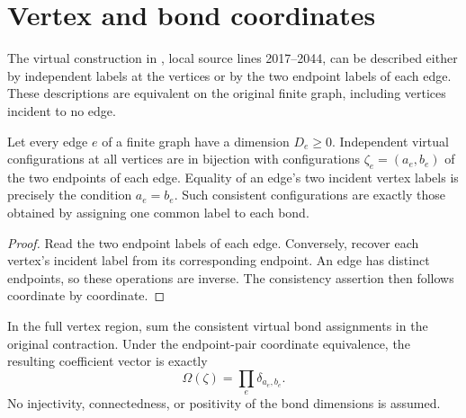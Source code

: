 \section{Vertex and bond coordinates}%
\label{sec:peps_vertex_bond_coordinates}

The virtual construction in \cite[Section~IV.C.1]{Cirac2021Matrix},
local source lines 2017--2044, can be described either by
independent labels at the vertices or by the two endpoint labels
of each edge. These descriptions are equivalent on the original
finite graph, including vertices incident to no edge.

\begin{lemma}%
    \label{thm:peps_vertex_bond_coordinates}
    \leanok
    Let every edge $e$ of a finite graph have a dimension $D_e\ge0$.
    Independent virtual configurations at all vertices are
    in bijection with configurations
    $\zeta_e=(a_e,b_e)$ of the two endpoints of each edge.
    Equality of an edge's two incident vertex labels is precisely
    the condition $a_e=b_e$.
    Such consistent configurations are exactly those obtained
    by assigning one common label to each bond.
\end{lemma}

\begin{proof}\leanok
    Read the two endpoint labels of each edge. Conversely, recover
    each vertex's incident label from its corresponding endpoint.
    An edge has distinct endpoints, so these operations are inverse.
    The consistency assertion then follows coordinate by coordinate.
\end{proof}

\begin{lemma}%
    \label{thm:peps_full_virtual_bond_product}
    \leanok
    In the full vertex region, sum the consistent virtual bond
    assignments in the original contraction. Under the endpoint-pair
    coordinate equivalence, the resulting coefficient vector is exactly
    \[
        \Omega(\zeta)=\prod_{e}\delta_{a_e,b_e}.
    \]
    No injectivity, connectedness, or positivity of the bond dimensions
    is assumed.
\end{lemma}

